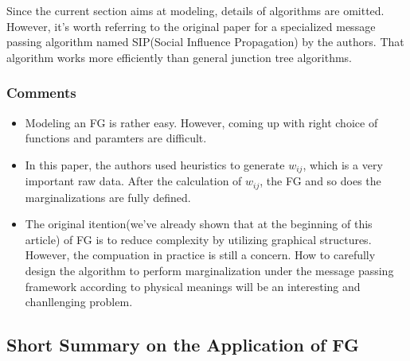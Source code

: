 \documentclass[11pt,a4paper]{article}
\begin{document}
Since the current section aims at modeling, details of algorithms are 
omitted. However, it's worth referring to the original paper for 
a specialized message passing algorithm named SIP(Social Influence 
Propagation) by the authors. That algorithm works more efficiently 
than general junction tree algorithms. 

\subsubsection{Comments}

\begin{itemize}
	\item Modeling an FG is rather easy. However, coming up with 
	right choice of functions and paramters are difficult. 
	\item In this paper, the authors used heuristics to generate 
	$w_{ij}$, which is a very important raw data. After the calculation 
	of $w_{ij}$, the FG and so does the marginalizations are fully defined. 
	\item The original itention(we've already shown that at the beginning
	of this article) of FG is to reduce complexity by utilizing graphical 
	structures. However, the compuation in practice is still a concern. 
	How to carefully design the algorithm to perform marginalization 
	under the message passing framework according to physical 
	meanings will be an interesting and chanllenging problem.   
\end{itemize}

\subsection{Short Summary on the Application of FG}
\end{document}
